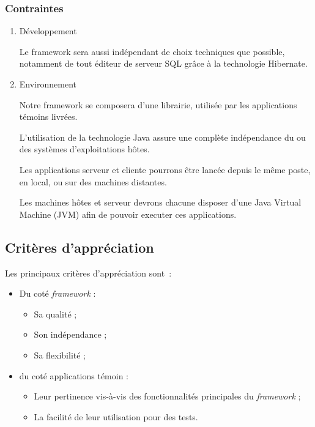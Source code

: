 \subsubsection{Contraintes}
\begin{enumerate}

	\item Développement

Le framework sera aussi indépendant de choix techniques que possible, notamment de tout éditeur de serveur SQL grâce à la technologie Hibernate.

	\item Environnement

Notre framework se composera d'une librairie, utilisée par les applications témoins livrées.

L'utilisation de la technologie Java assure une complète indépendance du ou des systèmes d'exploitations hôtes.

Les applications serveur et cliente pourrons être lancée depuis le même poste, en local, ou sur des machines distantes.

Les machines hôtes et serveur devrons chacune disposer d'une Java Virtual Machine (JVM) afin de pouvoir executer ces applications.

\end{enumerate}

\subsection{Critères d’appréciation}

Les principaux critères d'appréciation sont~:

\begin{itemize}
	\item Du coté \emph{framework} :
	\begin{itemize} 
		\item Sa qualité ;
		\item Son indépendance ;
		\item Sa flexibilité ;
	\end{itemize} 
	\item du coté applications témoin :
	\begin{itemize}
		\item Leur pertinence vis-à-vis des fonctionnalités principales du \emph{framework} ;
		\item La facilité de leur utilisation pour des tests.
	\end{itemize}
\end{itemize}


